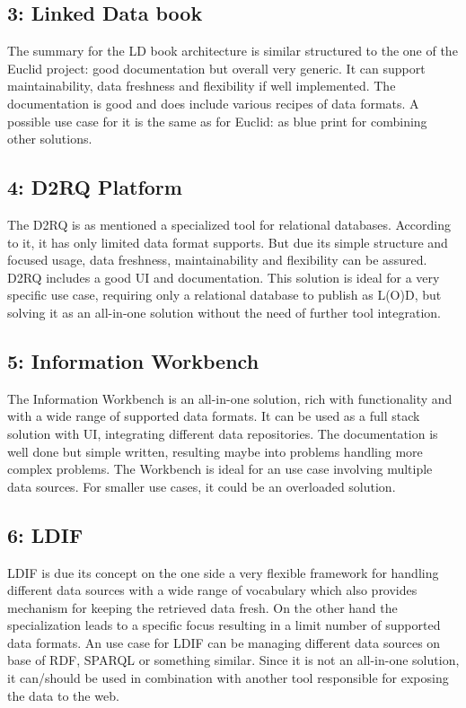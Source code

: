 \subsection*{3: Linked Data book}
The summary for the LD book architecture is similar structured to the one of the 
Euclid project: good documentation but overall very generic. It can support 
maintainability, data freshness and flexibility if well implemented. The 
documentation is good and does include various recipes of data formats.
A possible use case for it is the same as for Euclid: as blue print for combining 
other solutions.

\subsection*{4: D2RQ Platform}
The D2RQ is as mentioned a specialized tool for relational databases. According to 
it, it has only limited data format supports. But due its simple structure and 
focused usage, data freshness, maintainability and flexibility can be assured. 
D2RQ includes a good UI and documentation.
This solution is ideal for a very specific use case, requiring only a relational 
database to publish as L(O)D, but solving it as an all-in-one solution without the 
need of further tool integration.

\subsection*{5: Information Workbench}
The Information Workbench is an all-in-one solution, rich with functionality and 
with a wide range of supported data formats. It can be used as a full stack 
solution with UI, integrating different data repositories. The documentation is 
well done but simple written, resulting maybe into problems handling more complex 
problems.
The Workbench is ideal for an use case involving multiple data sources. For 
smaller use cases, it could be an overloaded solution.

\subsection*{6: LDIF}
LDIF is due its concept on the one side a very flexible framework for handling 
different data sources with a wide range of vocabulary which also provides 
mechanism for keeping the retrieved data fresh. On the other hand the 
specialization leads to a specific focus resulting in a limit number of supported 
data formats.
An use case for LDIF can be managing different data sources on base of RDF, SPARQL 
or something similar. Since it is not an all-in-one solution, it can/should be 
used in combination with another tool responsible for exposing the data to the 
web.

